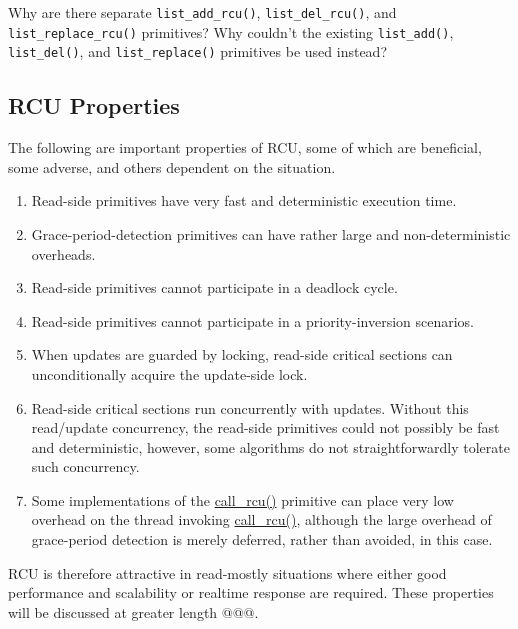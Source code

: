 \QuickQuiz{}
	Why are there separate {\tt list\_add\_rcu()},
	{\tt list\_del\_rcu()},
	and {\tt list\_replace\_rcu()} primitives?
	Why couldn't the existing {\tt list\_add()}, {\tt list\_del()},
	and {\tt list\_replace()} primitives be used instead?
 \QuickQuizEnd

\subsection{RCU Properties}
\label{sec:advsync:RCU Properties}

The following are important properties of RCU, some of which are
beneficial, some adverse, and others dependent on the situation.

\begin{enumerate}
\item	Read-side primitives have very fast and deterministic
	execution time.
\item	Grace-period-detection primitives can have rather large
	and non-deterministic overheads.
\item	Read-side primitives cannot participate in a deadlock cycle.
\item	Read-side primitives cannot participate in a priority-inversion
	scenarios.
\item	When updates are guarded by locking, read-side critical
	sections can unconditionally acquire the update-side lock.
\item	Read-side critical sections run concurrently with updates.
	Without this read/update concurrency, the read-side primitives could
	not possibly be fast and deterministic, however, some algorithms
	do not straightforwardly tolerate such concurrency.
\item	Some implementations of the \url{call_rcu()} primitive
	can place very low overhead on the thread invoking
	\url{call_rcu()}, although the large overhead of grace-period
	detection is merely deferred, rather than avoided, in this
	case.
\end{enumerate}

RCU is therefore attractive in read-mostly situations where either
good performance and scalability or realtime response are required.
These properties will be discussed at greater length @@@.

